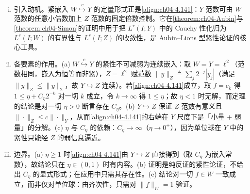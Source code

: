 \documentclass[../../main.tex]{subfiles}%
\begin{document}
\begin{remark}\label{remark:ch04-插值不等式动机}
\begin{enumerate}[(i)]
\item 引入动机。紧嵌入 $W\overset{c}{\hookrightarrow}Y$ 的定量形式正是\eqref{align:ch04-4.141}：$Y$ 范数可由 $W$ 范数的任意小倍数加上 $Z$ 范数的固定倍数控制。它在\cref{theorem:ch04-Aubin}与\cref{theorem:ch04-Simon}的证明中用于把 $L^r(I;Y)$ 中的 Cauchy 性化归为 $L^r(I;W)$ 的有界性与 $L^r(I;Z)$ 的收敛性，是 Aubin--Lions 型紧性论证的核心工具。

\item 各要素的作用。(a) $W\overset{c}{\hookrightarrow}Y$ 的紧性不可减弱为连续嵌入：取 $W=Y=\ell^2$（范数相同，嵌入为恒等而非紧），$Z=\ell^2$ 赋范数 $\|y\|_Z\triangleq\sum_j2^{-j}|y_j|$（满足 $\|y\|_Z\leqslant\|y\|_2$，故 $Y\hookrightarrow Z$ 连续）。若\eqref{align:ch04-4.141}成立，取 $f=e_k$ 得 $1\leqslant\eta+C_\eta2^{-k}$ 对一切 $k$ 成立，令 $k\to\infty$ 得 $1\leqslant\eta$；故 $\eta<1$ 时无解，而定理的结论是对一切 $\eta>0$ 断言存在 $C_\eta$。(b) $Y\hookrightarrow Z$ 保证 $Z$ 范数有意义且 $\|\cdot\|_Z\leqslant c\|\cdot\|_Y$，从而\eqref{align:ch04-4.141}的右端在 $Y$ 尺度下是「小量 $+$ 弱量」的分解。(c) $\eta$ 与 $C_\eta$ 的依赖：$C_\eta\to\infty$（$\eta\to0^+$），因为单位球在 $Y$ 中的紧性只能经 $Z$ 的弱信息逼近。

\item 边界。(a) $\eta\geqslant1$ 时\eqref{align:ch04-4.141}由 $Y\hookrightarrow Z$ 直接得到（取 $C_\eta$ 为嵌入常数），故结论只在 $\eta\in(0,1)$ 时有内容。(b) 证明是纯反证的紧性论证，不给出 $C_\eta$ 的显式形式；在应用中只需其存在性。(c) 结论对一切 $f\in W$ 一致成立，而非仅对单位球：由齐次性，只需对 $\|f\|_W=1$ 验证。
\end{enumerate}
\end{remark}
\end{document}
